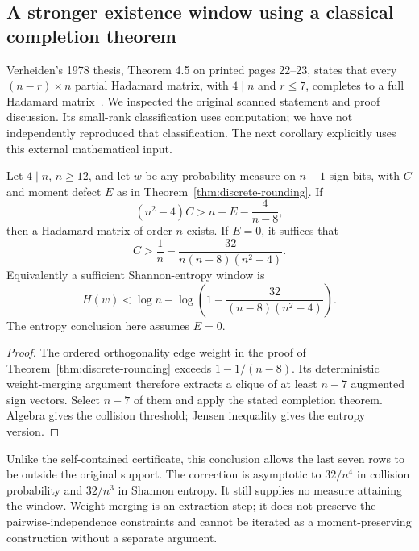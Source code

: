\subsection{A stronger existence window using a classical completion theorem}
Verheiden's 1978 thesis, Theorem 4.5 on printed pages 22--23,
states that every $(n-r)\times n$ partial Hadamard matrix, with
$4\mid n$ and $r\le7$, completes to a full Hadamard
matrix~\cite{Verheiden}. We inspected the original scanned statement
and proof discussion. Its small-rank classification uses computation;
we have not independently reproduced that classification. The next
corollary explicitly uses this external mathematical input.

\begin{corollary}\label{cor:completion-rounding}
Let $4\mid n$, $n\ge12$, and let $w$ be any probability measure on
$n-1$ sign bits, with $C$ and moment defect $E$ as in
Theorem~\ref{thm:discrete-rounding}. If
\[
 (n^2-4)C>n+E-\frac4{n-8},
\]
then a Hadamard matrix of order $n$ exists. If $E=0$, it suffices that
\[
 C>\frac1n-\frac{32}{n(n-8)(n^2-4)}.
\]
Equivalently a sufficient Shannon-entropy window is
\[
 H(w)<\log n-\log\left(1-\frac{32}{(n-8)(n^2-4)}\right).
\]
The entropy conclusion here assumes $E=0$.
\end{corollary}
\begin{proof}
The ordered orthogonality edge weight in the proof of
Theorem~\ref{thm:discrete-rounding} exceeds $1-1/(n-8)$.
Its deterministic weight-merging argument therefore extracts a clique
of at least $n-7$ augmented sign vectors. Select $n-7$ of them and
apply the stated completion theorem. Algebra gives the collision
threshold; Jensen inequality gives the entropy version.
\end{proof}
Unlike the self-contained certificate, this conclusion allows the
last seven rows to be outside the original support. The correction
is asymptotic to $32/n^4$ in collision probability and $32/n^3$ in
Shannon entropy. It still supplies no measure attaining the window.
Weight merging is an extraction step; it does not preserve the
pairwise-independence constraints and cannot be iterated as a
moment-preserving construction without a separate argument.
